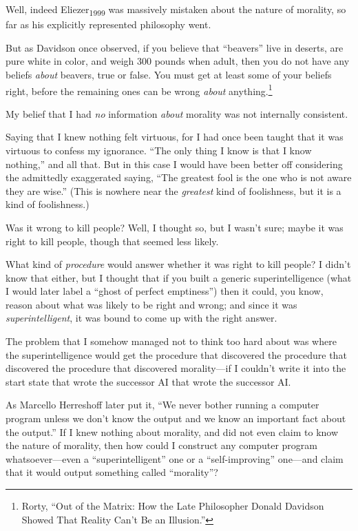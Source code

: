 {
 Well, indeed Eliezer\textsubscript{1999} was massively mistaken
about the nature of morality, so far as his explicitly represented
philosophy went.}

{
 But as Davidson once observed, if you believe that
``beavers'' live in deserts, are
pure white in color, and weigh 300 pounds when adult, then you do not
have any beliefs \textit{about} beavers, true or false. You must get at
least some of your beliefs right, before the remaining ones can be
wrong \textit{about} anything.\footnote{Rorty, ``Out of the Matrix: How the Late
Philosopher Donald Davidson Showed That Reality Can't
Be an Illusion.''}}

{
 My belief that I had \textit{no} information \textit{about}
morality was not internally consistent.}

{
 Saying that I knew nothing felt virtuous, for I had once been
taught that it was virtuous to confess my ignorance.
``The only thing I know is that I know
nothing,'' and all that. But in this case I would
have been better off considering the admittedly exaggerated saying,
``The greatest fool is the one who is not aware they
are wise.'' (This is nowhere near the
\textit{greatest} kind of foolishness, but it is a kind of
foolishness.)}

{
 Was it wrong to kill people? Well, I thought so, but I
wasn't sure; maybe it was right to kill people, though
that seemed less likely.}

{
 What kind of \textit{procedure} would answer whether it was right
to kill people? I didn't know that either, but I
thought that if you built a generic superintelligence (what I would
later label a ``ghost of perfect
emptiness'') then it could, you know, reason about
what was likely to be right and wrong; and since it was
\textit{superintelligent}, it was bound to come up with the right
answer.}

{
 The problem that I somehow managed not to think too hard about was
where the superintelligence would get the procedure that discovered the
procedure that discovered the procedure that discovered morality---if I
couldn't write it into the start state that wrote the
successor AI that wrote the successor AI.}

{
 As Marcello Herreshoff later put it, ``We never
bother running a computer program unless we don't know
the output and we know an important fact about the
output.'' If I knew nothing about morality, and did
not even claim to know the nature of morality, then how could I
construct any computer program whatsoever---even a
``superintelligent'' one or a
``self-improving'' one---and claim
that it would output something called
``morality''?}

